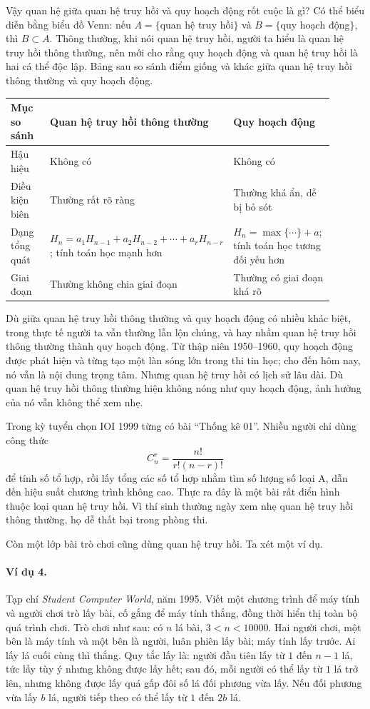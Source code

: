 \documentclass[11pt]{article}
\begin{document}
Vậy quan hệ giữa quan hệ truy hồi và quy hoạch động rốt cuộc là gì? Có thể
biểu diễn bằng biểu đồ Venn: nếu \(A=\{\)quan hệ truy hồi\(\}\) và
\(B=\{\)quy hoạch động\(\}\), thì \(B\subset A\). Thông thường, khi nói quan
hệ truy hồi, người ta hiểu là quan hệ truy hồi thông thường, nên mới cho rằng
quy hoạch động và quan hệ truy hồi là hai cá thể độc lập. Bảng sau so sánh
điểm giống và khác giữa quan hệ truy hồi thông thường và quy hoạch động.

\begin{center}
\begin{tabular}{p{0.18\linewidth}p{0.36\linewidth}p{0.36\linewidth}}
\hline
Mục so sánh & Quan hệ truy hồi thông thường & Quy hoạch động\\
\hline
Hậu hiệu & Không có & Không có\\
Điều kiện biên & Thường rất rõ ràng & Thường khá ẩn, dễ bị bỏ sót\\
Dạng tổng quát &
\(H_n=a_1H_{n-1}+a_2H_{n-2}+\cdots+a_rH_{n-r}\);
tính toán học mạnh hơn &
\(H_n=\max\{\cdots\}+a\);
tính toán học tương đối yếu hơn\\
Giai đoạn & Thường không chia giai đoạn & Thường có giai đoạn khá rõ\\
\hline
\end{tabular}
\end{center}

Dù giữa quan hệ truy hồi thông thường và quy hoạch động có nhiều khác biệt,
trong thực tế người ta vẫn thường lẫn lộn chúng, và hay nhầm quan hệ truy hồi
thông thường thành quy hoạch động. Từ thập niên 1950--1960, quy hoạch động
được phát hiện và từng tạo một làn sóng lớn trong thi tin học; cho đến hôm
nay, nó vẫn là nội dung trọng tâm. Nhưng quan hệ truy hồi có lịch sử lâu dài.
Dù quan hệ truy hồi thông thường hiện không nóng như quy hoạch động, ảnh
hưởng của nó vẫn không thể xem nhẹ.

Trong kỳ tuyển chọn IOI 1999 từng có bài ``Thống kê 01''. Nhiều người chỉ
dùng công thức
\[
  C_n^r=\frac{n!}{r!(n-r)!}
\]
để tính số tổ hợp, rồi lấy tổng các số tổ hợp nhằm tìm số lượng số loại A,
dẫn đến hiệu suất chương trình không cao. Thực ra đây là một bài rất điển
hình thuộc loại quan hệ truy hồi. Vì thí sinh thường ngày xem nhẹ quan hệ
truy hồi thông thường, họ dễ thất bại trong phòng thi.

Còn một lớp bài trò chơi cũng dùng quan hệ truy hồi. Ta xét một ví dụ.

\paragraph{Ví dụ 4.}
Tạp chí \emph{Student Computer World}, năm 1995. Viết một chương trình để máy
tính và người chơi trò lấy bài, cố gắng để máy tính thắng, đồng thời hiển thị
toàn bộ quá trình chơi. Trò chơi như sau: có \(n\) lá bài, \(3<n<10000\). Hai
người chơi, một bên là máy tính và một bên là người, luân phiên lấy bài; máy
tính lấy trước. Ai lấy lá cuối cùng thì thắng. Quy tắc lấy là: người đầu tiên
lấy từ \(1\) đến \(n-1\) lá, tức lấy tùy ý nhưng không được lấy hết; sau đó,
mỗi người có thể lấy từ \(1\) lá trở lên, nhưng không được lấy quá gấp đôi số
lá đối phương vừa lấy. Nếu đối phương vừa lấy \(b\) lá, người tiếp theo có
thể lấy từ \(1\) đến \(2b\) lá.
\end{document}
